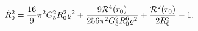 \begin{equation}
\dot{R}_{0}^{2} =\frac{16}{9}\pi^{2} G_{5}^{2} R_{0}^{2}
\varrho^{2}+\frac{9{\cal R}^{4}
(r_{0})}{256\pi^{2}G_{5}^{2}R_{0}^{6} \varrho^{2}} +\frac{{\cal
R}^2 (r_{0})}{2R_{0}^2} -1.
\end{equation}

